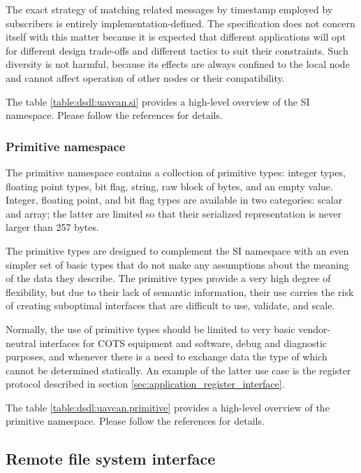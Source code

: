 The exact strategy of matching related messages by timestamp employed by subscribers is entirely
implementation-defined.
The specification does not concern itself with this matter because it is expected that different applications
will opt for different design trade-offs and different tactics to suit their constraints.
Such diversity is not harmful, because its effects are always confined to the local node and cannot affect
operation of other nodes or their compatibility.

The table \ref{table:dsdl:uavcan.si} provides a high-level overview of the SI namespace.
Please follow the references for details.


\subsubsection{Primitive namespace}

The primitive namespace contains a collection of primitive types:
integer types, floating point types, bit flag, string, raw block of bytes, and an empty value.
Integer, floating point, and bit flag types are available in two categories: scalar and array;
the latter are limited so that their serialized representation is never larger than 257 bytes.

The primitive types are designed to complement the SI namespace with an even simpler set of basic types
that do not make any assumptions about the meaning of the data they describe.
The primitive types provide a very high degree of flexibility, but due to their lack of semantic information,
their use carries the risk of creating suboptimal interfaces that are difficult to use, validate, and scale.

Normally, the use of primitive types should be limited to very basic vendor-neutral interfaces for COTS
equipment and software, debug and diagnostic purposes, and whenever there is a need to exchange data the
type of which cannot be determined statically. An example of the latter use case is the register protocol
described in section \ref{sec:application_register_interface}.

The table \ref{table:dsdl:uavcan.primitive} provides a high-level overview of the primitive namespace.
Please follow the references for details.


\subsection{Remote file system interface}\label{sec:application_file_system}


